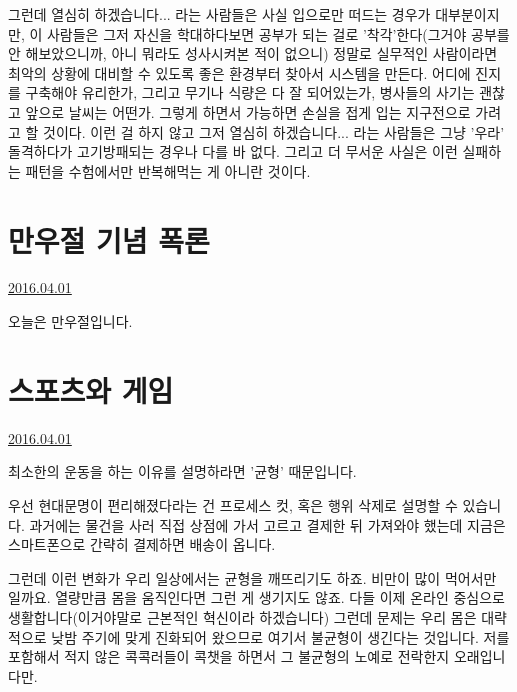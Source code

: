그런데 열심히 하겠습니다... 라는 사람들은 사실 입으로만 떠드는 경우가 대부분이지만,
이 사람들은 그저 자신을 학대하다보면 공부가 되는 걸로 '착각'한다(그거야 공부를 안 해보았으니까, 아니 뭐라도 성사시켜본 적이 없으니)
정말로 실무적인 사람이라면 최악의 상황에 대비할 수 있도록 좋은 환경부터 찾아서 시스템을 만든다.
어디에 진지를 구축해야 유리한가, 그리고 무기나 식량은 다 잘 되어있는가, 병사들의 사기는 괜찮고 앞으로 날씨는 어떤가.
그렇게 하면서 가능하면 손실을 접게 입는 지구전으로 가려고 할 것이다.
이런 걸 하지 않고 그저 열심히 하겠습니다... 라는 사람들은 그냥 '우라' 돌격하다가 고기방패되는 경우나 다를 바 없다.
그리고 더 무서운 사실은 이런 실패하는 패턴을 수험에서만 반복해먹는 게 아니란 것이다.
\vspace{5mm}








\section{만우절 기념 폭론}
\href{https://www.kockoc.com/Apoc/705958}{2016.04.01}

\vspace{5mm}

오늘은 만우절입니다.
\vspace{5mm}



\section{스포츠와 게임}
\href{https://www.kockoc.com/Apoc/707345}{2016.04.01}

\vspace{5mm}

최소한의 운동을 하는 이유를 설명하라면 '균형' 때문입니다.
\vspace{5mm}

우선 현대문명이 편리해졌다라는 건 프로세스 컷, 혹은 행위 삭제로 설명할 수 있습니다.
과거에는 물건을 사러 직접 상점에 가서 고르고 결제한 뒤 가져와야 했는데
지금은 스마트폰으로 간략히 결제하면 배송이 옵니다.
\vspace{5mm}

그런데 이런 변화가 우리 일상에서는 균형을 깨뜨리기도 하죠.
비만이 많이 먹어서만 일까요. 열량만큼 몸을 움직인다면 그런 게 생기지도 않죠.
다들 이제 온라인 중심으로 생활합니다(이거야말로 근본적인 혁신이라 하겠습니다)
그런데 문제는 우리 몸은 대략적으로 낮밤 주기에 맞게 진화되어 왔으므로 여기서 불균형이 생긴다는 것입니다.
저를 포함해서 적지 않은 콕콕러들이 콕챗을 하면서 그 불균형의 노예로 전락한지 오래입니다만.
\vspace{5mm}

